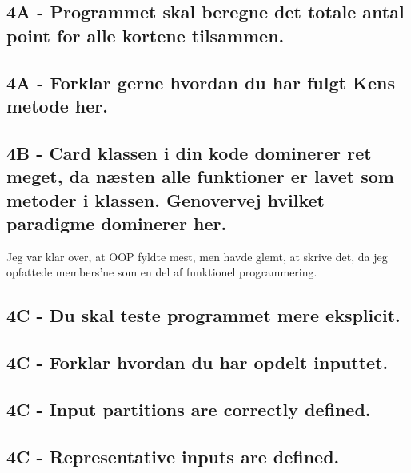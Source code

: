 \documentclass[a4paper,12pt]{article}
\begin{document}
\subsection*{4A - Programmet skal beregne det totale antal point for alle kortene tilsammen.}


\subsection*{4A - Forklar gerne hvordan du har fulgt Kens metode her.}


\subsection*{4B - Card klassen i din kode dominerer ret meget, da næsten alle funktioner er lavet som metoder i klassen.
Genovervej hvilket paradigme dominerer her.}
Jeg var klar over, at OOP fyldte mest, men havde glemt, at skrive det, da jeg opfattede members'ne som en del af funktionel programmering.


\subsection*{4C - Du skal teste programmet mere eksplicit.}


\subsection*{4C - Forklar hvordan du har opdelt inputtet.}


\subsection*{4C - Input partitions are correctly defined. }


\subsection*{4C - Representative inputs are defined.}
\end{document}
